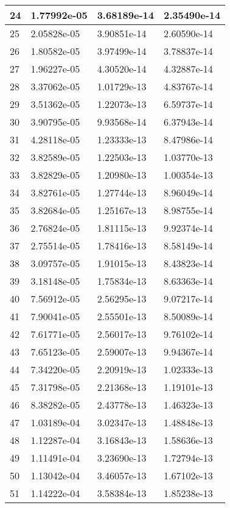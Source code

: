 \documentclass{article}
\begin{document}
\begin{table}[H]
{\begin{tabular}{|l|l|l|l|}
24 & 1.77992e-05 & 3.68189e-14 & 2.35490e-14 \\ \hline
25 & 2.05828e-05 & 3.90851e-14 & 2.60590e-14 \\ \hline
26 & 1.80582e-05 & 3.97499e-14 & 3.78837e-14 \\ \hline
27 & 1.96227e-05 & 4.30520e-14 & 4.32887e-14 \\ \hline
28 & 3.37062e-05 & 1.01729e-13 & 4.83767e-14 \\ \hline
29 & 3.51362e-05 & 1.22073e-13 & 6.59737e-14 \\ \hline
30 & 3.90795e-05 & 9.93568e-14 & 6.37943e-14 \\ \hline
31 & 4.28118e-05 & 1.23333e-13 & 8.47986e-14 \\ \hline
32 & 3.82589e-05 & 1.22503e-13 & 1.03770e-13 \\ \hline
33 & 3.82829e-05 & 1.20980e-13 & 1.00354e-13 \\ \hline
34 & 3.82761e-05 & 1.27744e-13 & 8.96049e-14 \\ \hline
35 & 3.82684e-05 & 1.25167e-13 & 8.98755e-14 \\ \hline
36 & 2.76824e-05 & 1.81115e-13 & 9.92374e-14 \\ \hline
37 & 2.75514e-05 & 1.78416e-13 & 8.58149e-14 \\ \hline
38 & 3.09757e-05 & 1.91015e-13 & 8.43823e-14 \\ \hline
39 & 3.18148e-05 & 1.75834e-13 & 8.63363e-14 \\ \hline
40 & 7.56912e-05 & 2.56295e-13 & 9.07217e-14 \\ \hline
41 & 7.90041e-05 & 2.55501e-13 & 8.50089e-14 \\ \hline
42 & 7.61771e-05 & 2.56017e-13 & 9.76102e-14 \\ \hline
43 & 7.65123e-05 & 2.59007e-13 & 9.94367e-14 \\ \hline
44 & 7.34220e-05 & 2.20919e-13 & 1.02333e-13 \\ \hline
45 & 7.31798e-05 & 2.21368e-13 & 1.19101e-13 \\ \hline
46 & 8.38282e-05 & 2.43778e-13 & 1.46323e-13 \\ \hline
47 & 1.03189e-04 & 3.02347e-13 & 1.48848e-13 \\ \hline
48 & 1.12287e-04 & 3.16843e-13 & 1.58636e-13 \\ \hline
49 & 1.11491e-04 & 3.23690e-13 & 1.72794e-13 \\ \hline
50 & 1.13042e-04 & 3.46057e-13 & 1.67102e-13 \\ \hline
51 & 1.14222e-04 & 3.58384e-13 & 1.85238e-13 \\ \hline

\end{tabular}}
\end{table}
\end{document}
